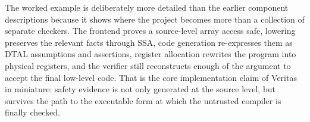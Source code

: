 The worked example is deliberately more detailed than the earlier component descriptions because it shows where the project becomes more than a collection of separate checkers. The frontend proves a source-level array access safe, lowering preserves the relevant facts through SSA, code generation re-expresses them as DTAL assumptions and assertions, register allocation rewrites the program into physical registers, and the verifier still reconstructs enough of the argument to accept the final low-level code. That is the core implementation claim of Veritas in miniature: safety evidence is not only generated at the source level, but survives the path to the executable form at which the untrusted compiler is finally checked.
